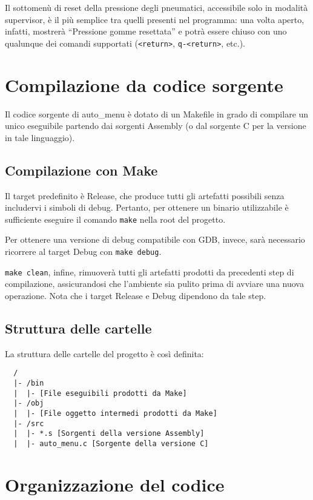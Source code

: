 \documentclass[
  12pt,
  a4paper,
  headings=optiontoheadandtoc
]{scrreprt}
\begin{document}
Il sottomenù di reset della pressione degli pneumatici, accessibile solo in modalità supervisor, è il più semplice tra quelli presenti nel programma: una volta aperto, infatti, mostrerà ``Pressione gomme resettata'' e potrà essere chiuso con uno qualunque dei comandi supportati (\texttt{<return>}, \texttt{q-<return>}, etc.).

\chapter[nonumber=true]{Compilazione da codice sorgente}

Il codice sorgente di auto\_menu è dotato di un Makefile in grado di compilare un unico eseguibile partendo dai sorgenti Assembly (o dal sorgente C per la versione in tale linguaggio).

\section[nonumber=true]{Compilazione con Make}

Il target predefinito è Release, che produce tutti gli artefatti possibili senza includervi i simboli di debug. Pertanto, per ottenere un binario utilizzabile è sufficiente eseguire il comando \texttt{make} nella root del progetto.

Per ottenere una versione di debug compatibile con GDB, invece, sarà necessario ricorrere al target Debug con \texttt{make debug}.

\texttt{make clean}, infine, rimuoverà tutti gli artefatti prodotti da precedenti step di compilazione, assicurandosi che l'ambiente sia pulito prima di avviare una nuova operazione. Nota che i target Release e Debug dipendono da tale step.

\section[nonumber=true]{Struttura delle cartelle}

La struttura delle cartelle del progetto è così definita:

\begin{verbatim}
  /
  |- /bin
  |  |- [File eseguibili prodotti da Make]
  |- /obj
  |  |- [File oggetto intermedi prodotti da Make]
  |- /src
  |  |- *.s [Sorgenti della versione Assembly]
  |  |- auto_menu.c [Sorgente della versione C]
\end{verbatim}

\chapter[nonumber=true]{Organizzazione del codice}
\end{document}
